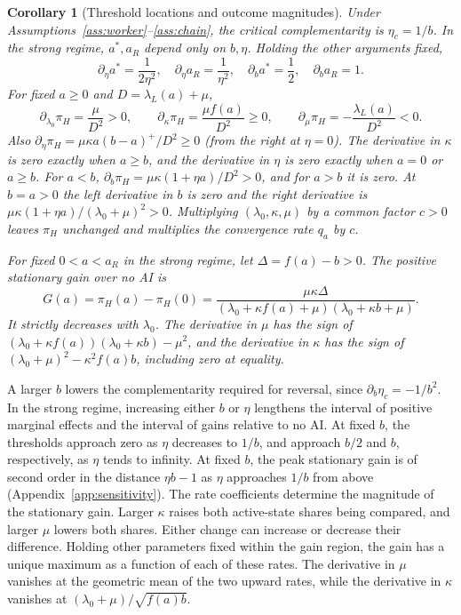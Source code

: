 \documentclass[11pt]{article}
\newtheorem{corollary}{Corollary}
\theoremstyle{definition}
\newcommand{\lam}{\lambda_L}
\newcommand{\share}{\pi_H}
\newcommand{\peak}{a^*}
\newcommand{\ret}{a_R}
\begin{document}
\begin{corollary}[Threshold locations and outcome magnitudes]\label{cor:sensitivity}
Under Assumptions~\ref{ass:worker}--\ref{ass:chain}, the critical
complementarity is $\eta_c=1/b$. In the strong regime, $\peak,\ret$ depend
only on $b,\eta$. Holding the other arguments fixed,
\begin{equation}\label{eq:threshold-sensitivity}
 \partial_\eta\peak=\frac{1}{2\eta^2},\quad
 \partial_\eta\ret=\frac{1}{\eta^2},\quad
 \partial_b\peak=\frac12,\quad \partial_b\ret=1 .
\end{equation}
For fixed $a\geq0$ and $D=\lam(a)+\mu$,
\begin{equation}\label{eq:level-sensitivity}
 \partial_{\lambda_0}\share=\frac{\mu}{D^2}>0,\qquad
 \partial_\kappa\share=\frac{\mu f(a)}{D^2}\geq0,\qquad
 \partial_\mu\share=-\frac{\lam(a)}{D^2}<0.
\end{equation}
Also $\partial_\eta\share=\mu\kappa a(b-a)^+/D^2\geq0$ (from the
right at $\eta=0$). The derivative in $\kappa$ is zero exactly when
$a\geq b$, and the derivative in $\eta$ is zero exactly when $a=0$ or
$a\geq b$. For $a<b$, $\partial_b\share=\mu\kappa(1+\eta a)/D^2>0$,
and for $a>b$ it is zero. At $b=a>0$ the left derivative in $b$ is zero
and the right derivative is $\mu\kappa(1+\eta a)/(\lambda_0+\mu)^2>0$.
Multiplying $(\lambda_0,\kappa,\mu)$ by a common factor $c>0$ leaves
$\share$ unchanged and multiplies the convergence rate $q_a$ by $c$.

For fixed $0<a<\ret$ in the strong regime, let $\Delta=f(a)-b>0$. The
positive stationary gain over no AI is
\begin{equation}\label{eq:gain}
 G(a)=\share(a)-\share(0)
 =\frac{\mu\kappa\Delta}{(\lambda_0+\kappa f(a)+\mu)
                            (\lambda_0+\kappa b+\mu)}.
\end{equation}
It strictly decreases with $\lambda_0$. The derivative in $\mu$ has the
sign of $(\lambda_0+\kappa f(a))(\lambda_0+\kappa b)-\mu^2$, and the
derivative in $\kappa$ has the sign of
$(\lambda_0+\mu)^2-\kappa^2 f(a)b$, including zero at equality.
\end{corollary}

A larger $b$ lowers the complementarity required for reversal, since
$\partial_b\eta_c=-1/b^2$. In the strong regime, increasing either $b$ or
$\eta$ lengthens the interval of positive marginal effects and the
interval of gains relative to no AI. At fixed $b$, the thresholds
approach zero as $\eta$ decreases to $1/b$, and approach $b/2$ and $b$,
respectively, as $\eta$ tends to infinity. At fixed $b$, the peak stationary gain is of second order in the
distance $\eta b-1$ as $\eta$ approaches $1/b$ from above
(Appendix~\ref{app:sensitivity}).
The rate coefficients determine the magnitude of the stationary gain.
Larger $\kappa$ raises both active-state shares being compared, and
larger $\mu$ lowers both shares. Either change can increase or decrease
their difference. Holding other parameters fixed within the gain region,
the gain has a unique maximum as a function of each of these rates.
The derivative in $\mu$ vanishes at the geometric mean of the two
upward rates, while the derivative in $\kappa$ vanishes at
$(\lambda_0+\mu)/\sqrt{f(a)b}$.
\end{document}

